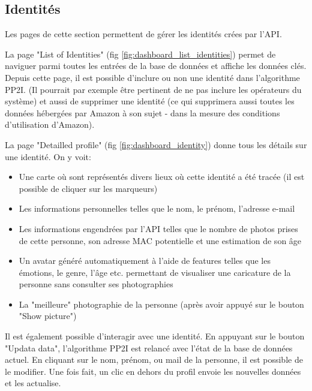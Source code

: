 \subsection{Identités}
Les pages de cette section permettent de gérer les identités crées par l'API.

La page "List of Identities" (fig \ref{fig:dashboard_list_identities}) permet de naviguer parmi toutes les entrées de la base de données et affiche les données clés.
Depuis cette page, il est possible d'inclure ou non une identité dans l'algorithme PP2I. (Il pourrait par exemple être pertinent de ne pas inclure les opérateurs du système)
et aussi de supprimer une identité (ce qui supprimera aussi toutes les données hébergées par Amazon à son sujet - dans la mesure des conditions d'utilisation d'Amazon).

La page "Detailled profile" (fig \ref{fig:dashboard_identity}) donne tous les détails sur une identité. On y voit:
\begin{itemize}
    \item Une carte où sont représentés divers lieux où cette identité a été tracée (il est possible de cliquer sur les marqueurs)
    \item Les informations personnelles telles que le nom, le prénom, l'adresse e-mail
    \item Les informations engendrées par l'API telles que le nombre de photos prises de cette personne, son adresse MAC potentielle et une estimation de son âge
    \item Un avatar généré automatiquement à l'aide de features telles que les émotions, le genre, l'âge etc. permettant de visualiser une caricature de la personne sans consulter ses photographies
    \item La "meilleure" photographie de la personne (après avoir appuyé sur le bouton "Show picture")
\end{itemize}

Il est également possible d'interagir avec une identité. En appuyant sur le bouton "Updata data", l'algorithme PP2I est relancé avec l'état de la base de données actuel.
En cliquant sur le nom, prénom, ou mail de la personne, il est possible de le modifier. Une fois fait, un clic en dehors du profil envoie les nouvelles données et les actualise.

